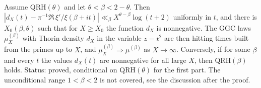 \begin{theorem}\label{ht:thm:primebuilt}
Assume $\mathrm{QRH}(\theta)$ and let $\theta<\beta<2-\theta$. Then $|d_X(t)-\pi^{-1}\Re\,\xi'/\xi(\beta+it)|\ll_\beta X^{\theta-\beta}\log(t+2)$ uniformly in $t$, and there is $X_0(\beta,\theta)$ such that for $X\ge X_0$ the function $d_X$ is nonnegative. The GGC laws $\mu^{(\beta)}_X$ with Thorin density $d_X$ in the variable $z=t^2$ are then hitting times built from the primes up to $X$, and $\mu^{(\beta)}_X\Rightarrow\mu^{(\beta)}$ as $X\to\infty$. Conversely, if for some $\beta$ and every $t$ the values $d_X(t)$ are nonnegative for all large $X$, then $\mathrm{QRH}(\beta)$ holds. Status: proved, conditional on $\mathrm{QRH}(\theta)$ for the first part. The unconditional range $1<\beta<2$ is not covered, see the discussion after the proof.
\end{theorem}


